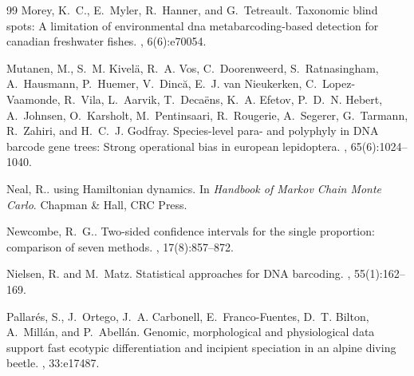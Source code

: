 \documentclass[12pt]{article}
\begin{document}
\begin{thebibliography}{99}
Morey, K.~C., E.~Myler, R.~Hanner, and
  G.~Tetreault\leavevmode\nopagebreak{}.
\newblock Taxonomic blind spots: A limitation of environmental dna
  metabarcoding-based detection for canadian freshwater fishes.
, 6(6):e70054.

Mutanen, M., S.~M. Kivelä, R.~A. Vos, C.~Doorenweerd, S.~Ratnasingham,
  A.~Hausmann, P.~Huemer, V.~Dincă, E.~J. van Nieukerken, C.~Lopez-Vaamonde,
  R.~Vila, L.~Aarvik, T.~Decaëns, K.~A. Efetov, P.~D.~N. Hebert, A.~Johnsen,
  O.~Karsholt, M.~Pentinsaari, R.~Rougerie, A.~Segerer, G.~Tarmann, R.~Zahiri,
  and H.~C.~J. Godfray\leavevmode\nopagebreak{}.
\newblock Species-level para- and polyphyly in {DNA} barcode gene trees: Strong
  operational bias in european lepidoptera.
, 65(6):1024--1040.

Neal, R.\leavevmode\nopagebreak{}.
 using {H}amiltonian dynamics.
\newblock In {\em Handbook of Markov Chain Monte Carlo}. Chapman \& Hall, CRC
  Press.

Newcombe, R.~G.\leavevmode\nopagebreak{}.
\newblock Two-sided confidence intervals for the single proportion: comparison
  of seven methods.
, 17(8):857--872.

Nielsen, R. and M.~Matz\leavevmode\nopagebreak{}.
\newblock Statistical approaches for {DNA} barcoding.
, 55(1):162--169.

Pallarés, S., J.~Ortego, J.~A. Carbonell, E.~Franco-Fuentes, D.~T. Bilton, A.~Millán, and P.~Abellán\leavevmode\nopagebreak{}.
\newblock Genomic, morphological and physiological data support fast ecotypic differentiation and incipient speciation in an alpine diving beetle.
, 33:e17487.


\end{thebibliography}
\end{document}
